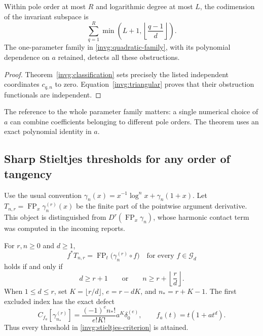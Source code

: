 \begin{corollary}
\label{invg:rank}
Within pole order at most $R$ and logarithmic degree at most $L$, the
codimension of the invariant subspace is
\begin{equation}\label{invg:rank-formula}
 \sum_{q=1}^{R}\min\!\left(L+1,\left\lfloor\frac{q-1}{d}\right\rfloor\right).
\end{equation}
The one-parameter family in \eqref{invg:quadratic-family}, with its
polynomial dependence on $a$ retained, detects all these obstructions.
\end{corollary}
\begin{proof}
Theorem~\ref{invg:classification} sets precisely the listed independent
coordinates $c_{q,n}$ to zero.  Equation~\eqref{invg:triangular} proves
that their obstruction functionals are independent.
\end{proof}

The reference to the whole parameter family matters: a single numerical
choice of $a$ can combine coefficients belonging to different pole orders.
The theorem uses an exact polynomial identity in $a$.

\subsection{Sharp Stieltjes thresholds for any order of tangency}

Use the usual convention
$\gamma_n(x)=x^{-1}\log^n x+\gamma_n(1+x)$.  Let
$T_{n,r}=\operatorname{FP}_x\gamma_n^{(r)}(x)$ be the finite part of
the pointwise argument derivative.  This object is distinguished from
$D^r(\operatorname{FP}_x\gamma_n)$, whose harmonic contact term was
computed in the incoming reports.

\begin{theorem}
\label{invg:stieltjes-threshold}
For $r,n\ge0$ and $d\ge1$,
\[
 f^*T_{n,r}=\operatorname{FP}_t\bigl(\gamma_n^{(r)}\circ f\bigr)
 \quad\text{for every }f\in\mathscr G_d
\]
holds if and only if
\begin{equation}\label{invg:stieltjes-criterion}
 d\ge r+1\qquad\text{or}\qquad
 n\ge r+\left\lfloor\frac rd\right\rfloor.
\end{equation}
When $1\le d\le r$, set $K=\lfloor r/d\rfloor$, $e=r-dK$, and
$n_*=r+K-1$.  The first excluded index has the exact defect
\begin{equation}\label{invg:stieltjes-top}
 C_{f_a}[\gamma_{n_*}^{(r)}]
 =\frac{(-1)^e n_*!}{e!K!}a^K\delta_0^{(e)},
 \qquad f_a(t)=t(1+a t^d).
\end{equation}
Thus every threshold in \eqref{invg:stieltjes-criterion} is attained.
\end{theorem}

